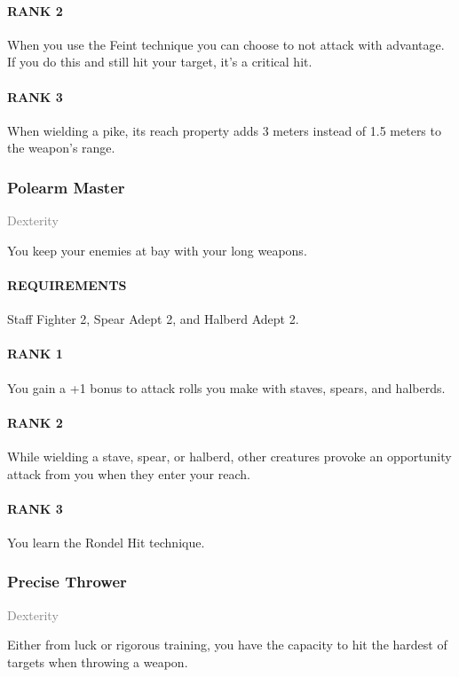 \paragraph{RANK 2} When you use the Feint technique you can choose to not attack with advantage.
If you do this and still hit your target, it's a critical hit.
\paragraph{RANK 3} When wielding a pike, its reach property adds 3 meters instead of 1.5 meters to the weapon's range.

\subsubsection{Polearm Master} \label{feat::polerarmmaster} %
\small{\textcolor{gray}{Dexterity}}

\normalsize
You keep your enemies at bay with your long weapons.
\paragraph{REQUIREMENTS} Staff Fighter 2, Spear Adept 2, and Halberd Adept 2.
\paragraph{RANK 1} You gain a +1 bonus to attack rolls you make with staves, spears, and halberds.
\paragraph{RANK 2} While wielding a stave, spear, or halberd, other creatures provoke an opportunity attack from you when they enter your reach.
\paragraph{RANK 3} You learn the Rondel Hit technique.

\subsubsection{Precise Thrower} \label{feat::precisethrower}
\small{\textcolor{gray}{Dexterity}}

\normalsize
Either from luck or rigorous training, you have the capacity to hit the hardest of targets when throwing a weapon.
